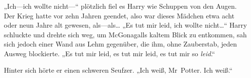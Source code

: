 „Ich—ich wollte nicht—“ plötzlich fiel es Harry wie Schuppen von den Augen. Der Krieg hatte vor zehn Jahren geendet, also war dieses Mädchen etwa acht oder neun Jahre alt gewesen, als—als…
„Es tut mir leid, ich wollte nicht…“ Harry schluckte und drehte sich weg, um McGonagalls kaltem Blick zu entkommen, sah sich jedoch einer Wand aus Lehm gegenüber, die ihm, ohne Zauberstab, jeden Ausweg blockierte. „Es tut mir leid, es tut mir leid, es tut mir so \emph{leid}.“

Hinter sich hörte er einen schweren Seufzer. „Ich weiß, Mr~Potter. Ich weiß.“



